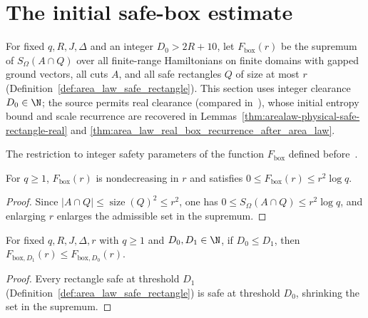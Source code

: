 \section{The initial safe-box estimate}
\label{sec:area_law_initial_box}

For fixed $q,R,J,\Delta$ and an integer $D_0>2R+10$, let $F_{\mathrm{box}}(r)$ be the
supremum of $S_\Omega(A\cap Q)$ over all finite-range Hamiltonians on finite
domains with gapped ground vectors, all cuts $A$, and all safe rectangles $Q$
of size at most $r$ (Definition~\ref{def:area_law_safe_rectangle}).
This section uses integer clearance $D_0\in\N$; the source permits real
clearance (compared in~\cite{gap:arealaw2d_safe_box_collar_scope}), whose
initial entropy bound and scale recurrence are recovered in
Lemmas~\ref{thm:arealaw-physical-safe-rectangle-real} and
\ref{thm:area_law_real_box_recurrence_after_area_law}.

\begin{definition}
    \label{def:area_law_box_entropy}
    \leanok
    The restriction to integer safety parameters of the function
    $F_{\mathrm{box}}$ defined before~\cite[Proposition~3.3]{OpenAI2026AreaLaw}.
\end{definition}

\begin{lemma}
    \label{thm:area_law_box_entropy_bounds}
    \leanok
    For $q\ge1$, $F_{\mathrm{box}}(r)$ is nondecreasing in $r$ and satisfies
    $0\le F_{\mathrm{box}}(r)\le r^2\log q$.
\end{lemma}
\begin{proof}\leanok
    Since $|A\cap Q|\le\operatorname{size}(Q)^2\le r^2$, one has
    $0\le S_\Omega(A\cap Q)\le r^2\log q$, and enlarging $r$ enlarges the
    admissible set in the supremum.
\end{proof}

\begin{lemma}
    \label{thm:area_law_box_entropy_safety}
    \leanok
    For fixed $q,R,J,\Delta,r$ with $q\ge1$ and $D_0,D_1\in\N$, if
    $D_0\le D_1$, then $F_{\mathrm{box},D_1}(r)\le F_{\mathrm{box},D_0}(r)$.
\end{lemma}
\begin{proof}\leanok
    Every rectangle safe at threshold $D_1$ (Definition~\ref{def:area_law_safe_rectangle})
    is safe at threshold $D_0$, shrinking the set in the supremum.
\end{proof}

